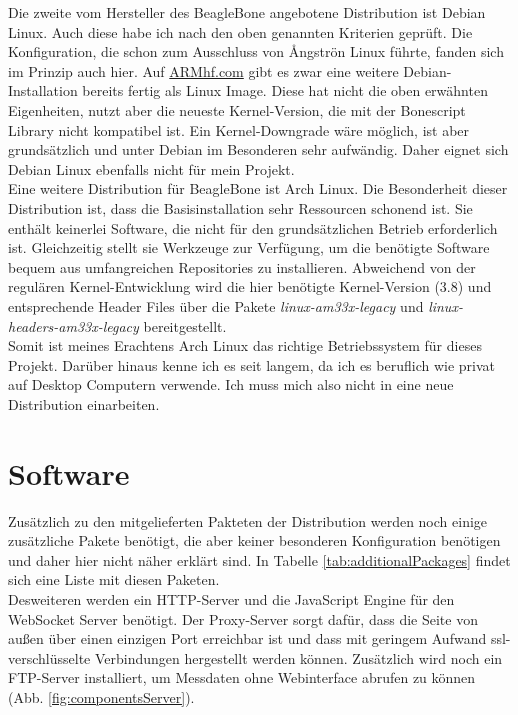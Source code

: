 Die zweite vom Hersteller des BeagleBone angebotene Distribution ist Debian Linux. Auch diese habe ich nach den oben genannten Kriterien geprüft. Die Konfiguration, die schon zum Ausschluss von {\AA}ngströn Linux führte, fanden sich im Prinzip auch hier. Auf \href{http://www.armhf.com/}{ARMhf.com} gibt es zwar eine weitere Debian-Installation bereits fertig als Linux Image. Diese hat nicht die oben erwähnten Eigenheiten, nutzt aber die neueste Kernel-Version, die mit der Bonescript Library nicht kompatibel ist. Ein Kernel-Downgrade wäre möglich, ist aber grundsätzlich und unter Debian im Besonderen sehr aufwändig. Daher eignet sich Debian Linux ebenfalls nicht für mein Projekt.\\

Eine weitere Distribution für BeagleBone ist Arch Linux. Die Besonderheit dieser Distribution ist, dass die Basisinstallation sehr Ressourcen schonend ist. Sie enthält keinerlei Software, die nicht für den grundsätzlichen Betrieb erforderlich ist. Gleichzeitig stellt sie Werkzeuge zur Verfügung, um die benötigte Software bequem aus umfangreichen Repositories zu installieren. Abweichend von der regulären Kernel-Entwicklung wird die hier benötigte Kernel-Version (3.8) und entsprechende Header Files über die Pakete \textit{linux-am33x-legacy} und \textit{linux-headers-am33x-legacy} bereitgestellt.\\

Somit ist meines Erachtens Arch Linux das richtige Betriebssystem für dieses Projekt. Darüber hinaus kenne ich es seit langem, da ich es beruflich wie privat auf Desktop Computern verwende. Ich muss mich also nicht in eine neue Distribution einarbeiten.


\section{Software}

Zusätzlich zu den mitgelieferten Pakteten der Distribution werden noch einige zusätzliche Pakete benötigt, die aber keiner besonderen Konfiguration benötigen und daher hier nicht näher erklärt sind. In Tabelle \ref{tab:additionalPackages} findet sich eine Liste mit diesen Paketen.\\

Desweiteren werden ein HTTP-Server und die JavaScript Engine für den WebSocket Server benötigt. Der Proxy-Server sorgt dafür, dass die Seite von außen über einen einzigen Port erreichbar ist und dass mit geringem Aufwand \gls{ssl}-verschlüsselte Verbindungen hergestellt werden können. Zusätzlich wird noch ein FTP-Server installiert, um Messdaten ohne Webinterface abrufen zu können (Abb. \ref{fig:componentsServer}).

